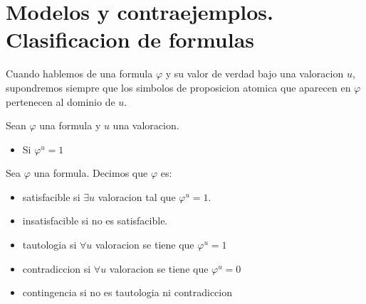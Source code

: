 \section{Modelos y contraejemplos. Clasificacion de formulas}

\begin{remark}
	Cuando hablemos de una formula \(\varphi\) y su valor de verdad bajo una valoracion \(u \), supondremos siempre que los simbolos de proposicion atomica que aparecen en \(\varphi\) pertenecen al dominio de \(u \).
\end{remark}

\begin{definition}
	Sean \(\varphi\) una formula y \(u \) una valoracion.
	\begin{itemize}
		\item Si \(\varphi^{u} = 1  \)
	\end{itemize}
\end{definition}

\begin{definition}
	Sea \(\varphi\) una formula. Decimos que \(\varphi \) es:
	\begin{itemize}
		\item satisfacible si \(\exists u \) valoracion tal que \(\varphi^{u} = 1 \).
		\item insatisfacible si no es satisfacible.
		\item tautologia si \(\forall u \) valoracion se tiene que \(\varphi^{u} = 1 \)
		\item contradiccion si \(\forall u \) valoracion se tiene que \(\varphi^{u} = 0 \)
		\item contingencia si no es tautologia ni contradiccion
	\end{itemize}
\end{definition}

